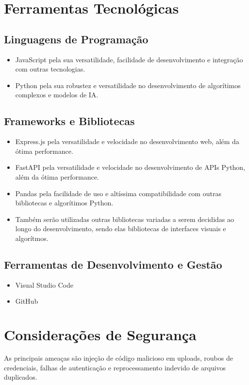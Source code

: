 \documentclass[a4paper,12pt]{article}
\begin{document}
\section{Ferramentas Tecnológicas}

\subsection{Linguagens de Programação}
\begin{itemize}
    \item JavaScript pela sua versatilidade, facilidade de desenvolvimento e
integração com outras tecnologias.
    \item Python pela sua robustez e versatilidade no desenvolvimento de
algorítimos complexos e modelos de IA.
\end{itemize}

\subsection{Frameworks e Bibliotecas}
\begin{itemize}
    \item Express.js pela versatilidade e velocidade no desenvolvimento web, além
da ótima performance.
    \item FastAPI pela versatilidade e velocidade no desenvolvimento de APIs
Python, além da ótima performance.
    \item Pandas pela facilidade de uso e altíssima compatibilidade com outras
bibliotecas e algorítimos Python.
    \item Também serão utilizadas outras bibliotecas variadas a serem decididas
ao longo do desenvolvimento, sendo elas bibliotecas de interfaces visuais e
algorítmos.
\end{itemize}

\subsection{Ferramentas de Desenvolvimento e Gestão}
\begin{itemize}
    \item Visual Studio Code
    \item GitHub
\end{itemize}

\section{Considerações de Segurança}
As principais ameaças são injeção de código malicioso em uploads,
roubos de credenciais, falhas de autenticação e reprocessamento indevido de
arquivos duplicados.
\end{document}
